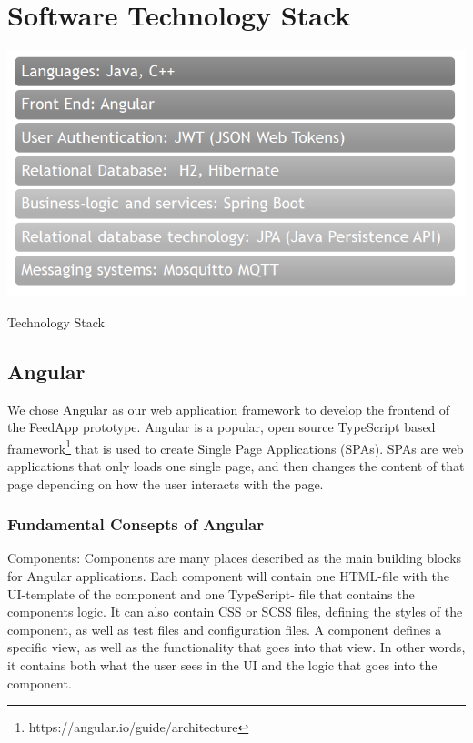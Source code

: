 \clearpage
\section{Software Technology Stack}
\label{sec:technology}

\begin{center}
\includegraphics[scale=0.5]{figs/t_stack.png}
\par
Technology Stack
\end{center}

\subsection{Angular}
We chose Angular as our web application framework to develop the frontend of the FeedApp
prototype. Angular is a popular, open source TypeScript based framework\footnote{https://angular.io/guide/architecture } that is used to create
Single Page Applications (SPAs). SPAs are web applications that only loads one single page, and then
changes the content of that page depending on how the user interacts with the page.

\subsubsection{Fundamental Consepts of Angular }

\noindent Components: Components are many places described as the main building blocks for Angular applications. Each
component will contain one HTML-file with the UI-template of the component and one TypeScript-
file that contains the components logic. It can also contain CSS or SCSS files, defining the styles of the
component, as well as test files and configuration files. A component defines a specific view, as well
as the functionality that goes into that view. In other words, it contains both what the user sees in
the UI and the logic that goes into the component. \\

